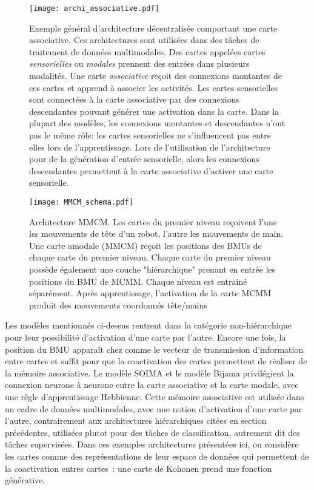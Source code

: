 \documentclass[../main]{subfiles}
\begin{document}
\begin{figure}
    \texttt{[image: archi\_associative.pdf]}
    \caption{Exemple général d'architecture décentralisée comportant une carte associative. Ces architectures sont utilisées dans des tâches de traitement de données multimodales.
     Des cartes appelées cartes \emph{sensorielles} ou \emph{modales} prennent des entrées dans plusieurs modalités. Une carte \emph{associative} reçoit des connexions montantes de ces cartes et apprend à associer les activités. Les cartes sensorielles sont connectées à la carte associative par des connexions descendantes pouvant générer une activation dans la carte. Dans la plupart des modèles, les connexions montantes et descendantes n'ont pas le même rôle: les cartes sensorielles ne s'influencent pas entre elles lors de l'apprentissage.
     Lors de l'utilisation de l'architecture pour de la génération d'entrée sensorielle, alors les connexions descendantes permettent à la carte associative d'activer une carte sensorielle. \label{fig:archi_associative}
     }
\end{figure}

\begin{figure}
    \centering
    \texttt{[image: MMCM\_schema.pdf]}
    \caption{Architecture MMCM. Les cartes du premier niveau reçoivent l'une les mouvements de tête d'un robot, l'autre les mouvements de main. 
    Une carte amodale (MMCM) reçoit les positions des BMUs de chaque carte du premier niveau. Chaque carte du premier niveau possède également une couche "hiérarchique" prenant en entrée les positions du BMU de MCMM. Chaque niveau est entrainé séparément.
    Après apprentissage, l'activation de la carte MCMM produit des mouvements coordonnés tête/mains~\cite{dominey13}\label{fig:mmcm}}
\end{figure}

Les modèles mentionnés ci-dessus rentrent dans la catégorie non-hiérarchique pour leur possibilité d'activation d'une carte par l'autre. Encore une fois, la position du BMU apparaît chez \cite{dominey13} comme le vecteur de transmission d'information  entre cartes et suffit pour que la coactivation des cartes permettent de réaliser de la mémoire associative. Le modèle SOIMA et le modèle Bijama privilégient la connexion neurone à neurone entre la carte associative et la carte modale, avec une règle d'apprentissage Hebbienne.
Cette mémoire associative est utilisée dans un cadre de données multimodales, avec une notion d'activation d'une carte par l'autre, contrairement aux architectures hiérarchiques citées en section précédentes, utilisées plutot pour des tâches de classification, autrement dit des tâches supervisées.
Dans ces exemples architectures présentées ici, on considère les cartes comme des représentations de leur espace de données qui permettent de la coactivation entres cartes~: une carte de Kohonen prend une fonction générative.
\end{document}
